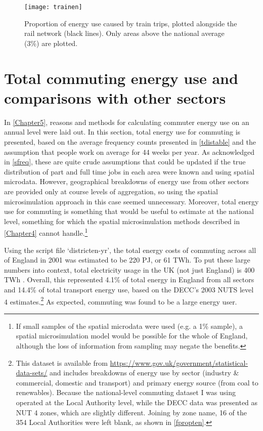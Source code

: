 \begin{figure}[htbp]
\begin{center}
    \texttt{[image: trainen]}  \end{center}
  \caption[Proportion of energy use caused by train trips]
  {Proportion of energy use caused by train trips, plotted alongside the rail
network (black lines). Only areas above the national average (3\%) are
plotted.}
 \label{ftrainen}
\end{figure}

\section{Total commuting energy use and comparisons with other sectors}
\label{stotalcomp}
In \cref{Chapter5}, reasons and methods for calculating commuter energy use
on an annual level were laid out. In this section, total energy use
for commuting is presented, based on the average frequency counts presented
in \cref{tdistable} and the assumption that people work on average for
44 weeks per year. As acknowledged in \cref{sfreq}, these are quite crude
assumptions that could be updated if the true distribution of part and
full time jobs in each area were known and using spatial microdata.
However, geographical breakdowns of energy use from other sectors are
provided only at course levels of aggregation, so using the spatial
microsimulation approach in this case seemed unnecessary. Moreover, total
energy use for commuting is something that would be useful to estimate at
the national level, something for which the spatial microsimulation methods
described in \cref{Chapter4} cannot
handle.\footnote{If small samples of the
spatial microdata were used (e.g. a 1\% sample), a spatial microsimulation
model would be possible for the whole of England, although the loss of
information from sampling may negate the benefits.
}

Using the script file `districten-yr', the total energy costs of commuting
across all of England in 2001 was estimated to be 220 PJ, or 61 TWh.
To put these large numbers into context, total electricity usage in the UK
(not just England) is 400 TWh \citep{MacKay2009}. Overall, this represented
4.1\% of total energy in England from all sectors and 14.4\% of total transport
energy use, based on the DECC's 2003 NUTS level 4
estimates.\footnote{This
dataset is available from {\color{blue} \href{https://www.gov.uk/government/statistical-data-sets/total-final-energy-consumption-at-regional-and-local-authority-level-2005-to-2010}{https://www.gov.uk/government/statistical-data-sets/}}
and includes breakdowns of energy use by sector (industry \& commercial, domestic and transport)
and primary energy source (from coal to renewables).
Because the national-level commuting dataset I was using operated at the
Local Authority level, while the DECC data was presented as NUT 4 zones,
which are slightly different. Joining by zone name, 16 of the 354 Local
Authorities were left blank, as shown in \cref{fpropten}.
}
As expected, commuting was found to be a large energy user.

